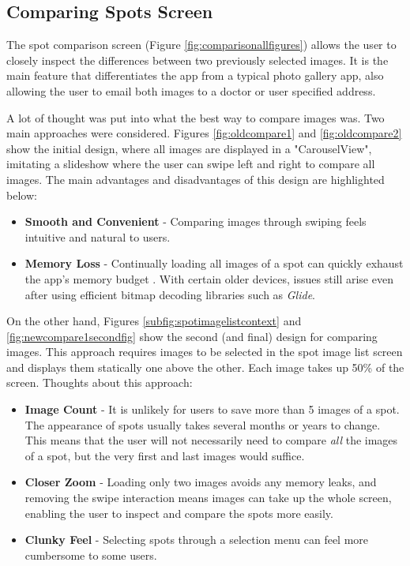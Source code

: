 \subsection{Comparing Spots Screen} \label{CompareScreenDesignSection}

The spot comparison screen (Figure \ref{fig:comparisonallfigures}) allows the user to closely inspect the differences between two previously selected images. It is the main feature that differentiates the app from a typical photo gallery app, also allowing the user to email both images to a doctor or user specified address.

A lot of thought was put into what the best way to compare images was. Two main approaches were considered. Figures \ref{fig:oldcompare1} and \ref{fig:oldcompare2} show the initial design, where all images are displayed in a "CarouselView", imitating a slideshow where the user can swipe left and right to compare all images. The main advantages and disadvantages of this design are highlighted below:
\begin{itemize}
    \item \textbf{Smooth and Convenient} - Comparing images through swiping feels intuitive and natural to users.
    \item \textbf{Memory Loss} - Continually loading all images of a spot can quickly exhaust the app's memory budget \cite{handlingbitmaps}. With certain older devices, issues still arise even after using efficient bitmap decoding libraries such as \emph{Glide}.
\end{itemize}

On the other hand, Figures \ref{subfig:spotimagelistcontext} and \ref{fig:newcompare1secondfig} show the second (and final) design for comparing images. This approach requires images to be selected in the spot image list screen and displays them statically one above the other. Each image takes up 50\% of the screen. Thoughts about this approach:
\begin{itemize}
    \item \textbf{Image Count} - It is unlikely for users to save more than 5 images of a spot. The appearance of spots usually takes several months or years to change. This means that the user will not necessarily need to compare \emph{all} the images of a spot, but the very first and last images would suffice.
    \item \textbf{Closer Zoom} - Loading only two images avoids any memory leaks, and removing the swipe interaction means images can take up the whole screen, enabling the user to inspect and compare the spots more easily.
    \item \textbf{Clunky Feel} - Selecting spots through a selection menu can feel more cumbersome to some users.
\end{itemize}

